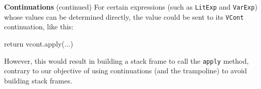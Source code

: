 \begin{minipage}[t]{\sw}
\slidenumber
\LARGE
{\bf Continuations} (continued)\exx
For certain expressions (such as \verb'LitExp' and \verb'VarExp')
whose values can be determined directly,
the value could be sent
to its \verb'VCont' continuation, like this:
\Large
\begin{qv}
return vcont.apply(...)
\end{qv}
\LARGE
However, this would result in building a stack frame
to call the \verb'apply' method,
contrary to our objective of using continuations (and the trampoline)
to avoid building stack frames.
\end{minipage}
